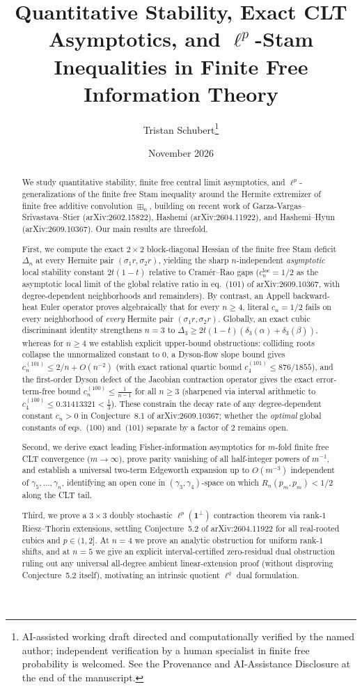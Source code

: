 \documentclass[11pt,a4paper]{article}
\title{\textbf{Quantitative Stability, Exact CLT Asymptotics, and $\ell^p$-Stam Inequalities in Finite Free Information Theory}}
\author{Tristan Schubert\thanks{AI-assisted working draft directed and computationally verified by the named author; independent verification by a human specialist in finite free probability is welcomed. See the Provenance and AI-Assistance Disclosure at the end of the manuscript.}}
\date{November 2026}
\theoremstyle{definition}
\newcommand{\one}{\mathbf{1}}
\begin{document}
\maketitle

\begin{abstract}
We study quantitative stability, finite free central limit asymptotics, and $\ell^p$-generalizations of the finite free Stam inequality around the Hermite extremizer of finite free additive convolution $\boxplus_n$, building on recent work of Garza-Vargas--Srivastava--Stier (arXiv:2602.15822), Hashemi (arXiv:2604.11922), and Hashemi--Hyun (arXiv:2609.10367). Our main results are threefold.

First, we compute the exact $2\times 2$ block-diagonal Hessian of the finite free Stam deficit $\Delta_n$ at every Hermite pair $(\sigma_1 r, \sigma_2 r)$, yielding the sharp $n$-independent \emph{asymptotic} local stability constant $2t(1-t)$ relative to Cram\'er--Rao gaps ($c_n^{\mathrm{loc}} = 1/2$ as the asymptotic local limit of the global relative ratio in eq.~(101) of arXiv:2609.10367, with degree-dependent neighborhoods and remainders). By contrast, an Appell backward-heat Euler operator proves algebraically that for every $n \ge 4$, literal $c_n = 1/2$ fails on every neighborhood of \emph{every} Hermite pair $(\sigma_1 r, \sigma_2 r)$. Globally, an exact cubic discriminant identity strengthens $n=3$ to $\Delta_3 \ge 2t(1-t)(\delta_3(\alpha)+\delta_3(\beta))$, whereas for $n \ge 4$ we establish explicit upper-bound obstructions: colliding roots collapse the unnormalized constant to $0$, a Dyson-flow slope bound gives $c_n^{(101)} \le 2/n + O(n^{-2})$ (with exact rational quartic bound $c_4^{(101)} \le 876/1855$), and the first-order Dyson defect of the Jacobian contraction operator gives the exact error-term-free bound $c_n^{(100)} \le \frac{1}{n-1}$ for all $n \ge 3$ (sharpened via interval arithmetic to $c_4^{(100)} \le 0.31413321 < \frac{1}{3}$). These constrain the decay rate of any degree-dependent constant $c_n > 0$ in Conjecture~8.1 of arXiv:2609.10367; whether the \emph{optimal} global constants of eqs.~(100) and~(101) separate by a factor of $2$ remains open.

Second, we derive exact leading Fisher-information asymptotics for $m$-fold finite free CLT convergence ($m \to \infty$), prove parity vanishing of all half-integer powers of $m^{-1}$, and establish a universal two-term Edgeworth expansion up to $O(m^{-3})$ independent of $\gamma_5, \dots, \gamma_n$, identifying an open cone in $(\gamma_3, \gamma_4)$-space on which $R_n(p_m, p_m) < 1/2$ along the CLT tail.

Third, we prove a $3\times 3$ doubly stochastic $\ell^p(\one^\perp)$ contraction theorem via rank-$1$ Riesz--Thorin extensions, settling Conjecture~5.2 of arXiv:2604.11922 for all real-rooted cubics and $p \in (1, 2]$. At $n = 4$ we prove an analytic obstruction for uniform rank-$1$ shifts, and at $n = 5$ we give an explicit interval-certified zero-residual dual obstruction ruling out any universal all-degree ambient linear-extension proof (without disproving Conjecture~5.2 itself), motivating an intrinsic quotient $\ell^q$ dual formulation.
\end{abstract}
\end{document}
